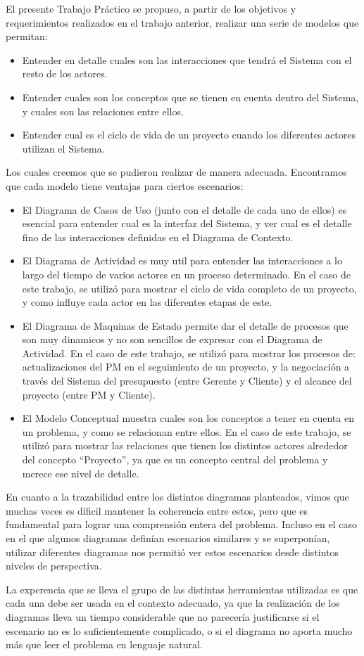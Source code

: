 El presente Trabajo Práctico se propuso, a partir de los objetivos y requerimientos realizados en el trabajo anterior,
realizar una serie de modelos que permitan:

\begin{itemize}
	\item Entender en detalle cuales son las interacciones que tendrá el Sistema con el resto de los actores.
	\item Entender cuales son los conceptos que se tienen en cuenta dentro del Sistema, y cuales son las relaciones entre ellos.
	\item Entender cual es el ciclo de vida de un proyecto cuando los diferentes actores utilizan el Sistema.
\end{itemize}

Los cuales creemos que se pudieron realizar de manera adecuada. Encontramos que cada modelo tiene ventajas para ciertos escenarios:
\begin{itemize}
	\item El Diagrama de Casos de Uso (junto con el detalle de cada uno de ellos) es esencial para entender cual es la interfaz del Sistema, y ver cual es el detalle fino de las interacciones definidas en el Diagrama de Contexto.
	\item El Diagrama de Actividad es muy util para entender las interacciones a lo largo del tiempo de varios actores en un proceso determinado. En el caso de este trabajo, se utilizó para mostrar el ciclo de vida completo de un proyecto, y como influye cada actor en las diferentes etapas de este.
	\item El Diagrama de Maquinas de Estado permite dar el detalle de procesos que son muy dinamicos y no son sencillos de expresar con el Diagrama de Actividad. En el caso de este trabajo, se utilizó para mostrar los procesos de: actualizaciones del PM en el seguimiento de un proyecto, y la negociación a través del Sistema del presupuesto (entre Gerente y Cliente) y el alcance del proyecto (entre PM y Cliente).
	\item El Modelo Conceptual muestra cuales son los conceptos a tener en cuenta en un problema, y como se relacionan entre ellos. En el caso de este trabajo, se utilizó para mostrar las relaciones que tienen los distintos actores alrededor del concepto ``Proyecto'', ya que es un concepto central del problema y merece ese nivel de detalle.
\end{itemize}

En cuanto a la trazabilidad entre los distintos diagramas planteados, vimos que muchas veces es díficil mantener la coherencia entre estos, pero que es fundamental para lograr una comprensión entera del problema. Incluso en el caso en el que algunos diagramas definían escenarios similares y se superponían, utilizar diferentes diagramas nos permitió ver estos escenarios desde distintos niveles de perspectiva.

La experencia que se lleva el grupo de las distintas herramientas utilizadas es que cada una debe ser usada en el contexto adecuado, ya que la realización de los diagramas lleva un tiempo considerable que no parecería justificarse si el escenario no es lo suficientemente complicado, o si el diagrama no aporta mucho más que leer el problema en lenguaje natural.
